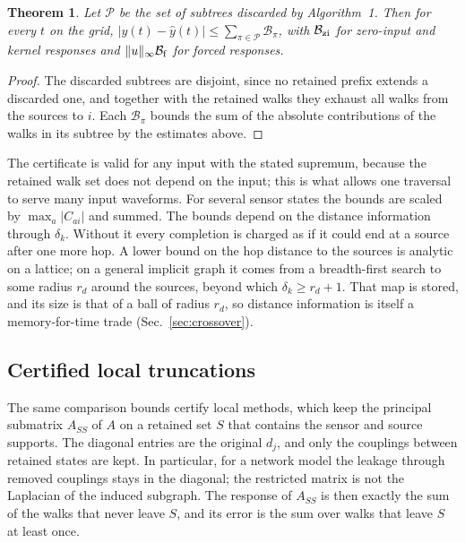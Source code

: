 \documentclass[aps,pra,superscriptaddress,floatfix,longbibliography,twocolumn]{revtex4-2}
\newtheorem{theorem}{Theorem}
\begin{document}
\begin{theorem}\label{thm:certificate}
Let $\mathcal{P}$ be the set of subtrees discarded by Algorithm~1. Then for every $t$ on the grid, $|y(t)-\hat y(t)|\le\sum_{\pi\in\mathcal{P}}\mathcal{B}_\pi$, with $\mathcal{B}_{\rm zi}$ for zero-input and kernel responses and $\|u\|_\infty\mathcal{B}_{\rm f}$ for forced responses.
\end{theorem}
\begin{proof}
The discarded subtrees are disjoint, since no retained prefix extends a discarded one, and together with the retained walks they exhaust all walks from the sources to $i$. Each $\mathcal{B}_\pi$ bounds the sum of the absolute contributions of the walks in its subtree by the estimates above.
\end{proof}
The certificate is valid for any input with the stated supremum, because the retained walk set does not depend on the input; this is what allows one traversal to serve many input waveforms. For several sensor states the bounds are scaled by $\max_a|C_{ai}|$ and summed. The bounds depend on the distance information through $\delta_k$. Without it every completion is charged as if it could end at a source after one more hop. A lower bound on the hop distance to the sources is analytic on a lattice; on a general implicit graph it comes from a breadth-first search to some radius $r_d$ around the sources, beyond which $\delta_k\ge r_d+1$. That map is stored, and its size is that of a ball of radius $r_d$, so distance information is itself a memory-for-time trade (Sec.~\ref{sec:crossover}).

\subsection{Certified local truncations}\label{sec:local}
The same comparison bounds certify local methods, which keep the principal submatrix $A_{SS}$ of $A$ on a retained set $S$ that contains the sensor and source supports. The diagonal entries are the original $d_j$, and only the couplings between retained states are kept. In particular, for a network model the leakage through removed couplings stays in the diagonal; the restricted matrix is not the Laplacian of the induced subgraph. The response of $A_{SS}$ is then exactly the sum of the walks that never leave $S$, and its error is the sum over walks that leave $S$ at least once.
\end{document}
